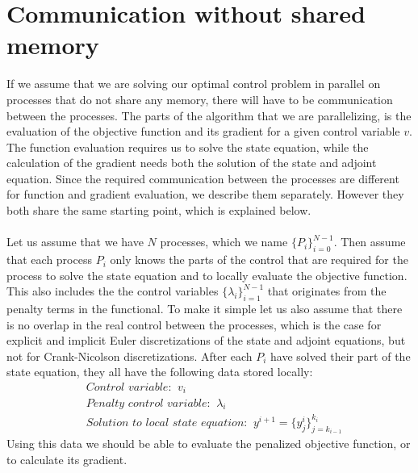 \section{Communication without shared memory}
If we assume that we are solving our optimal control problem in parallel on processes that do not share any memory, there will have to be communication between the processes. The parts of the algorithm that we are parallelizing, is the evaluation of the objective function and its gradient for a given control variable $v$. The function evaluation requires us to solve the state equation, while the calculation of the gradient needs both the solution of the state and adjoint equation. Since the required communication between the processes are different for function and gradient evaluation, we describe them separately. However they both share the same starting point, which is explained below.
\\
\\
Let us assume that we have $N$ processes, which we name $\{P_{i}\}_{i=0}^{N-1}$. Then assume that each process $P_i$ only knows the parts of the control that are required for the process to solve the state equation and to locally evaluate the objective function. This also includes the the control variables $\{\lambda_i\}_{i=1}^{N-1}$ that originates from the penalty terms in the functional. To make it simple let us also assume that there is no overlap in the real control between the processes, which is the case for explicit and implicit Euler discretizations of the state and adjoint equations, but not for Crank-Nicolson discretizations. After each $P_i$ have solved their part of the state equation, they all have the following data stored locally:
\begin{align*}
&\textit{Control variable: } \ v_i \\
&\textit{Penalty control variable: } \ \lambda_i \\
&\textit{Solution to local state equation: } \ y^{i+1} =\{y_j^i\}_{j=k_{i-1}}^{ k_{i}}
\end{align*}
Using this data we should be able to evaluate the penalized objective function, or to calculate its gradient.
